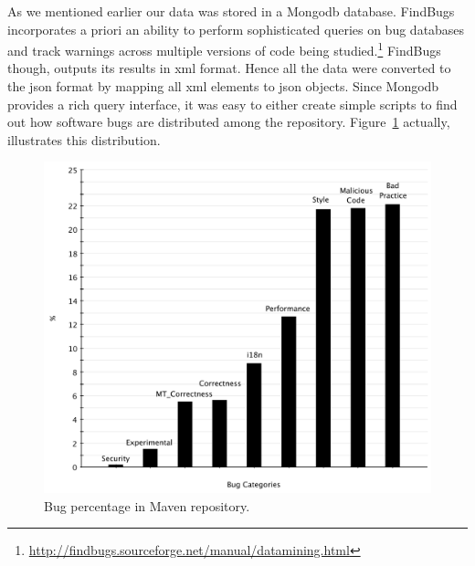 \documentclass{sig-alternate}
\begin{document}
As we mentioned earlier our data was stored in a
Mongo{\sc db} database.
FindBugs incorporates a priori an ability to perform
sophisticated queries on bug databases and
track warnings across multiple versions of code being
studied.\footnote{\url{http://findbugs.sourceforge.net/manual/datamining.html}}
FindBugs though,
outputs its results in  {\sc xml} format.
Hence all the data were
converted to the {\sc json} format
by mapping all {\sc xml} elements to {\sc json} objects.
Since Mongo{\sc db} provides a rich query interface,
it was easy to either create
simple scripts to find out
how software bugs are distributed among the
repository. Figure~\ref{fig:bug-per}
actually, illustrates this distribution.

\begin{figure}[t]
	\centering
	\includegraphics[scale=0.32]{figures/bug_percent}
	\caption{Bug percentage in Maven repository.}
	\label{fig:bug-per} 
\end{figure}

\end{document}
